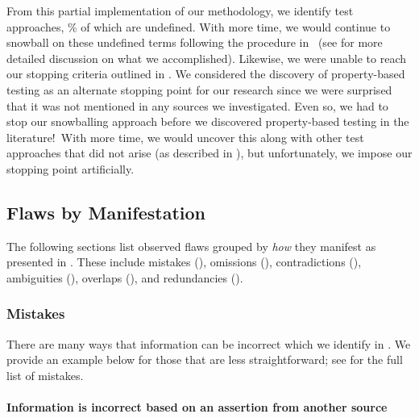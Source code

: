 From this partial implementation of our methodology, we identify
\approachCount{} test approaches, \undefPerc\% of which are undefined.
With more time, we would continue to snowball on these undefined terms
following the procedure in \ifnotpaper\ (see
     for more detailed discussion on what we
    accomplished)\fi.
Likewise, we were unable to reach our stopping criteria outlined in
. We considered the discovery of property-based testing as an
alternate stopping point for our research%
 since we were
surprised that it was not mentioned in any sources we investigated. Even so, we
had to stop our snowballing approach before we discovered property-based testing
in the literature!\ifnotpaper\ With more time, we would uncover this along with
    other test approaches that did not arise (as described in
    ), but unfortunately, we impose our stopping point
    artificially.\newpage\fi

\subsection{Flaws by Manifestation}\label{flawMnfsts}

The following sections list observed flaws grouped by \emph{how} they manifest
as presented in . These include mistakes (),
omissions (), contradictions (), ambiguities
(), overlaps (), and redundancies ().

\subsubsection{Mistakes}\label{wrong}

There are many ways that information can be incorrect which we identify in
. We provide an example below for those that are less
straightforward\ifnotpaper; see  for the full list of
mistakes\fi.



\paragraph{Information is incorrect based on an assertion from another source}
\qualImprovFlaw{}

